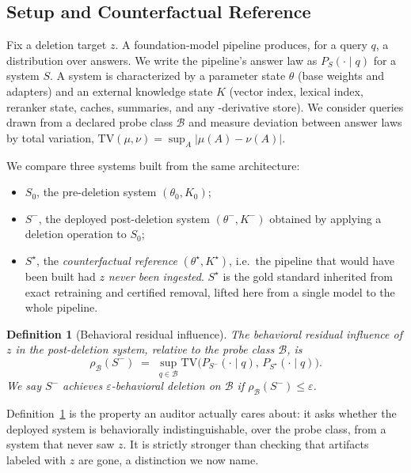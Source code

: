 \documentclass[10pt,journal,compsoc]{IEEEtran}
\newtheorem{definition}{Definition}
\begin{document}
\subsection{Setup and Counterfactual Reference}

Fix a deletion target $z$. A foundation-model pipeline produces, for a
query $q$, a distribution over answers. We write the pipeline's answer
law as $P_{S}(\cdot\mid q)$ for a system $S$. A system is characterized
by a parameter state $\theta$ (base weights and adapters) and an
external knowledge state $K$ (vector index, lexical index, reranker
state, caches, summaries, and any -derivative store). We
consider queries drawn from a declared probe class $\mathcal{B}$ and
measure deviation between answer laws by total variation,
$\mathrm{TV}(\mu,\nu)=\sup_{A}\lvert\mu(A)-\nu(A)\rvert$.

We compare three systems built from the same architecture:
\begin{itemize}
\item $S_0$, the pre-deletion system $(\theta_0,K_0)$;
\item $S^{-}$, the deployed post-deletion system $(\theta^{-},K^{-})$
obtained by applying a deletion operation to $S_0$;
\item $S^{\star}$, the \emph{counterfactual reference} $(\theta^{\star},
K^{\star})$, i.e.\ the pipeline that would have been built had $z$
\emph{never been ingested}. $S^{\star}$ is the gold standard inherited
from exact retraining and certified removal, lifted here from a single
model to the whole pipeline.
\end{itemize}

\begin{definition}[Behavioral residual influence]
\label{def:residual}
The behavioral residual influence of $z$ in the post-deletion system,
relative to the probe class $\mathcal{B}$, is
\[
 \rho_{\mathcal{B}}(S^{-})
 \;=\;
 \sup_{q\in\mathcal{B}}
 \mathrm{TV}\!\big(P_{S^{-}}(\cdot\mid q),\,P_{S^{\star}}(\cdot\mid q)\big).
\]
We say $S^{-}$ achieves \emph{$\varepsilon$-behavioral deletion} on
$\mathcal{B}$ if $\rho_{\mathcal{B}}(S^{-})\le\varepsilon$.
\end{definition}

Definition~\ref{def:residual} is the property an auditor actually cares
about: it asks whether the deployed system is behaviorally
indistinguishable, over the probe class, from a system that never saw
$z$. It is strictly stronger than checking that artifacts labeled with
$z$ are gone, a distinction we now name.
\end{document}
